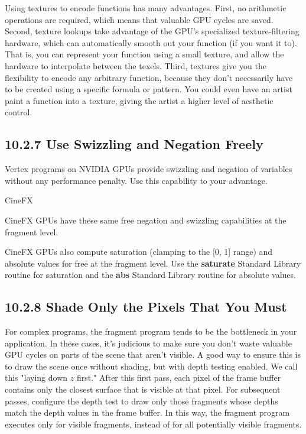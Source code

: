 \documentclass[../main.tex]{subfiles}
\begin{document}
Using textures to encode functions has many advantages. First, no arithmetic operations are required, which means that valuable GPU cycles are saved. Second, texture lookups take advantage of the GPU's specialized texture-filtering hardware, which can automatically smooth out your function (if you want it to). That is, you can represent your function using a small texture, and allow the hardware to interpolate between the texels. Third, textures give you the flexibility to encode any arbitrary function, because they don't necessarily have to be created using a specific formula or pattern. You could even have an artist paint a function into a texture, giving the artist a higher level of aesthetic control.

\subsection{10.2.7 Use Swizzling and Negation Freely}

Vertex programs on NVIDIA GPUs provide swizzling and negation of variables without any performance penalty. Use this capability to your advantage.

\begin{framed}
CineFX

CineFX GPUs have these same free negation and swizzling capabilities at the fragment level.

CineFX GPUs also compute saturation (clamping to the [0, 1] range) and absolute values for free at the fragment level. Use the \textbf{saturate} Standard Library routine for saturation and the \textbf{abs} Standard Library routine for absolute values.
\end{framed}

\subsection{10.2.8 Shade Only the Pixels That You Must}

For complex programs, the fragment program tends to be the bottleneck in your application. In these cases, it's judicious to make sure you don't waste valuable GPU cycles on parts of the scene that aren't visible. A good way to ensure this is to draw the scene once without shading, but with depth testing enabled. We call this "laying down $z$ first." After this first pass, each pixel of the frame buffer contains only the closest surface that is visible at that pixel. For subsequent passes, configure the depth test to draw only those fragments whose depths match the depth values in the frame buffer. In this way, the fragment program executes only for visible fragments, instead of for all potentially visible fragments.
\end{document}
